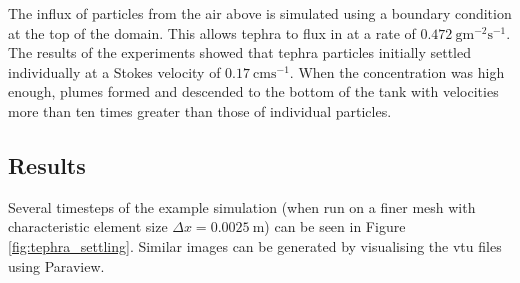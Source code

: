 The influx of particles from the air above is simulated using a  boundary condition at the top of the domain. This allows tephra to flux in at a rate of $0.472\ \mathrm{gm^{-2}s^{-1}}$. The results of the experiments showed that tephra particles initially settled individually at a Stokes velocity of $0.17\ \mathrm{cms^{-1}}$. When the concentration was high enough, plumes formed and descended to the bottom of the tank with velocities more than ten times greater than those of individual particles.

\subsection{Results}
Several timesteps of the example simulation (when run on a finer mesh with characteristic element size $\Delta x = 0.0025\ \mathrm{m}$) can be seen in Figure \ref{fig:tephra_settling}. Similar images can be generated by visualising the vtu files using Paraview.

